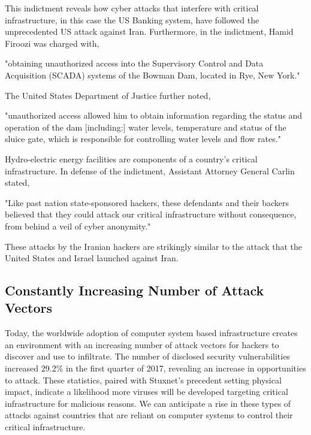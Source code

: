 \documentclass[12pt]{article}
\begin{document}
\begin{multicols}{2}
This indictment reveals how cyber attacks that interfere with critical infrastructure, in this case the US Banking system, have followed the unprecedented US attack against Iran. Furthermore, in the indictment, Hamid Firoozi was charged with,

\begin{displayquote}
"obtaining unauthorized access into the Supervisory Control and Data Acquisition (SCADA) systems of the Bowman Dam, located in Rye, New York."\cite{sevenIraniansIndicted}
\end{displayquote}

The United States Department of Justice further noted,

\begin{displayquote}
"unauthorized access allowed him to obtain information regarding the status and operation of the dam [including:] water levels, temperature and status of the sluice gate, which is responsible for controlling water levels and flow rates."\cite{sevenIraniansIndicted}
\end{displayquote}

Hydro-electric energy facilities are components of a country's critical infrastructure. In defense of the indictment, Assistant Attorney General Carlin stated,

\begin{displayquote}
"Like past nation state-sponsored hackers, these defendants and their backers believed that they could attack our critical infrastructure without consequence, from behind a veil of cyber anonymity."
\end{displayquote}

These attacks by the Iranian hackers are strikingly similar to the attack that the United States and Israel launched against Iran.

\subsection{Constantly Increasing Number of Attack Vectors}

Today, the worldwide adoption of computer system based infrastructure creates an environment with an increasing number of attack vectors for hackers to discover and use to infiltrate. The number of disclosed security vulnerabilities increased 29.2\% in the first quarter of 2017, revealing an increase in opportunities to attack.\cite{industrialCyberVulnerabilities} These statistics, paired with Stuxnet's precedent setting physical impact, indicate a likelihood more viruses will be developed targeting critical infrastructure for malicious reasons.\cite{industrialCyberVulnerabilities} We can anticipate a rise in these types of attacks against countries that are reliant on computer systems to control their critical infrastructure.


\end{multicols}
\end{document}
